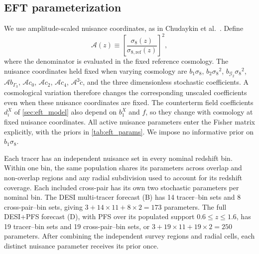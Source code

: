 \documentclass[a4paper,11pt]{article}
\newcommand{\revchange}[1]{{\color{RevisionColor}#1}}
\newcommand{\se}{\ensuremath{\sigma_{8}}\xspace}
\newcommand{\G}{\mathcal{G}}
\newcommand{\ctilde}{\tilde{c}}
\begin{document}
\subsection{EFT parameterization}
\label{sec:eft_params}

\revchange{We use amplitude-scaled nuisance coordinates, as in
Chudaykin et al.~\cite{Chudaykin:2025aux}.
Define
\[
\mathcal A(z)\equiv\left[\frac{\sigma_8(z)}{\sigma_{8,\mathrm{ref}}(z)}\right]^2,
\]
where the denominator is evaluated in the fixed reference cosmology.
The nuisance coordinates held fixed when varying cosmology are
$b_1\se$, $b_2\se^2$, $b_{\G_2}\se^2$,
$\mathcal A b_{\Gamma_3}$, $\mathcal A c_0$,
$\mathcal A c_2$, $\mathcal A c_4$,
$\mathcal A^2\ctilde$, and the three dimensionless stochastic
coefficients. A cosmological variation therefore changes the
corresponding unscaled coefficients even when these nuisance
coordinates are fixed.
The counterterm field coefficients $d_i^X$ of \cref{sec:eft_model} also depend
on $b_1^X$ and $f$, so they change with cosmology at fixed nuisance coordinates.
All active nuisance parameters enter the Fisher matrix explicitly,
with the priors in \cref{tab:eft_params}.
We impose no informative prior on $b_1\se$.

Each tracer has an independent nuisance set in every nominal
redshift bin. Within one bin, the same population shares its
parameters across overlap and non-overlap regions and any radial
subdivision used to account for its redshift coverage. Each included cross-pair has its own two stochastic
parameters per nominal bin. The DESI multi-tracer forecast (B) has
14 tracer--bin sets and 8 cross-pair--bin sets, giving
$3+14\times11+8\times2=173$ parameters. The full DESI+PFS forecast (D), with
PFS over its populated support $0.6\leq z\leq1.6$, has 19 tracer--bin sets
and 19 cross-pair--bin sets, or $3+19\times11+19\times2=250$
parameters. After combining the independent survey regions and radial
cells, each distinct nuisance parameter receives its prior once.}
\end{document}

